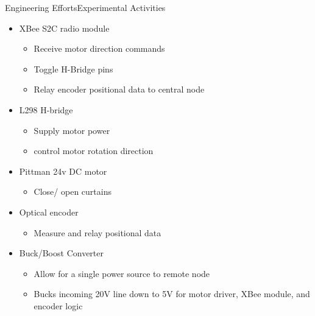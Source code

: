 \documentclass{beamer}
\begin{document}
 \begin{frame}{Engineering Efforts}{Experimental Activities}
\begin{itemize}

\item XBee S2C radio module

     \begin{itemize}

         \item Receive motor direction commands

         \item Toggle H-Bridge pins

         \item Relay encoder positional data to central node

     \end{itemize}

\item L298 H-bridge
     \begin{itemize}
            \item Supply motor power
            \item control motor rotation direction
     \end{itemize}

\item Pittman 24v DC motor
     \begin{itemize}
         \item Close/ open curtains
     \end{itemize}

\item Optical encoder
     \begin{itemize}
         \item Measure and relay positional data
     \end{itemize}
\item Buck/Boost Converter
    \begin{itemize}
        \item Allow for a single power source to remote node
        \item Bucks incoming 20V line down to 5V for motor driver, XBee module, and encoder logic  
    \end{itemize}

\end{itemize}

\end{frame} 
  
\end{document}

